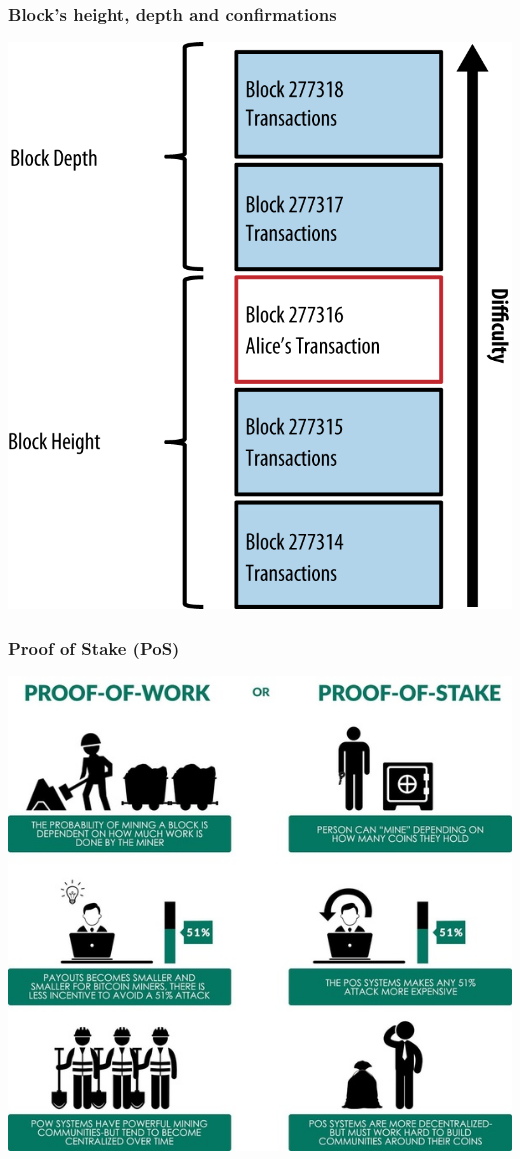 \documentclass[11pt]{beamer}  %
\begin{document}
\begin{frame}\frametitle{Block's height, depth and confirmations}

  \begin{center}
    \includegraphics[scale=1,clip=false]{pictures/mbc2_0209.png}
  \end{center}

\end{frame}

\begin{frame}\frametitle{Proof of Stake (PoS)}
 \begin{center}
    \includegraphics[scale=0.39,clip=false]{pictures/proofs.jpg}
  \end{center}
\end{frame}
\end{document}
